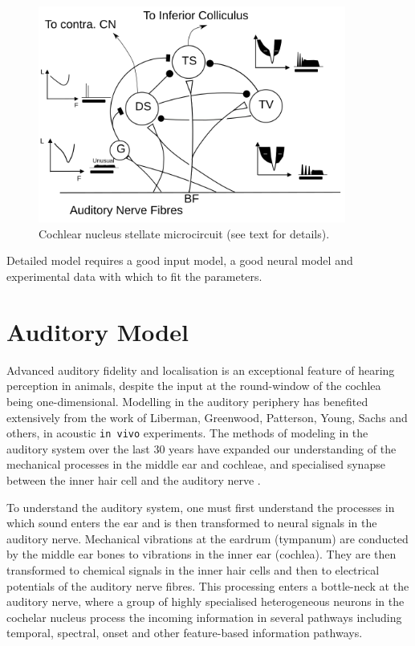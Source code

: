 \begin{enumerate}
\begin{figure}[htb]
  \centering
  \includegraphics[width=0.9\textwidth]{gfx/CNcircuit}
  \caption{Cochlear nucleus stellate microcircuit (see text for details). }
  \label{fig:microcircuit}
\end{figure}


\medskip{}

Detailed model requires a good input model, a good neural model and
experimental data with which to fit the parameters.  


\section{Auditory Model}



Advanced auditory fidelity and localisation is an exceptional feature
of hearing perception in animals, despite the input at the
round-window of the cochlea being one-dimensional.  Modelling in the
auditory periphery has benefited extensively from the work of
Liberman, Greenwood, Patterson, Young, Sachs and others, in acoustic
\texttt{in vivo} experiments. The methods of modeling in the auditory
system over the last 30 years have expanded our understanding of the
mechanical processes in the middle ear and cochleae, and specialised
synapse between the inner hair cell and the auditory nerve
\citep{DavisVoigt:1991,Carney:1993,MeddisHewittEtAl:1990}.


To understand the auditory system, one must first understand the
processes in which sound enters the ear and is then transformed to
neural signals in the auditory nerve. Mechanical vibrations at the
eardrum (tympanum) are conducted by the middle ear bones to vibrations
in the inner ear (cochlea). They are then transformed to chemical
signals in the inner hair cells and then to electrical potentials of
the auditory nerve fibres. This processing enters a bottle-neck at the
auditory nerve, where a group of highly specialised heterogeneous
neurons in the cochelar nucleus process the incoming information in
several pathways including temporal, spectral, onset and
other feature-based information pathways.


\end{enumerate}
